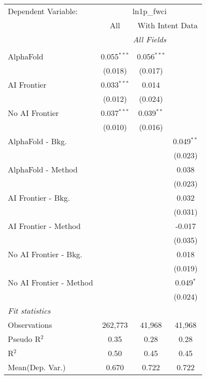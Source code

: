 \begingroup
\centering
\begin{tabular}{lccc}
   \tabularnewline \midrule \midrule
   Dependent Variable: & \multicolumn{3}{c}{ln1p\_fwci}\\
 & \multicolumn{1}{c}{All} & \multicolumn{2}{c}{With Intent Data} \\
\cmidrule(lr){2-2} \cmidrule(lr){3-4}
 & \multicolumn{3}{c}{\textit{All Fields}} \\ \\
   AlphaFold               & 0.055$^{***}$ & 0.056$^{***}$ &   \\   
                           & (0.018)       & (0.017)       &   \\   
   AI Frontier             & 0.033$^{***}$ & 0.014         &   \\   
                           & (0.012)       & (0.024)       &   \\   
   No AI Frontier          & 0.037$^{***}$ & 0.039$^{**}$  &   \\   
                           & (0.010)       & (0.016)       &   \\   
   AlphaFold - Bkg.        &               &               & 0.049$^{**}$\\   
                           &               &               & (0.023)\\   
   AlphaFold - Method      &               &               & 0.038\\   
                           &               &               & (0.023)\\   
   AI Frontier - Bkg.      &               &               & 0.032\\   
                           &               &               & (0.031)\\   
   AI Frontier - Method    &               &               & -0.017\\   
                           &               &               & (0.035)\\   
   No AI Frontier - Bkg.   &               &               & 0.018\\   
                           &               &               & (0.019)\\   
   No AI Frontier - Method &               &               & 0.049$^{*}$\\   
                           &               &               & (0.024)\\   
   \midrule
   \emph{Fit statistics}\\
   Observations            & 262,773       & 41,968        & 41,968\\  
   Pseudo R$^2$            & 0.35          & 0.28          & 0.28\\  
   R$^2$                   & 0.50          & 0.45          & 0.45\\  
Mean(Dep. Var.) & 0.670 & 0.722 & 0.722 \\
   

\end{tabular}
